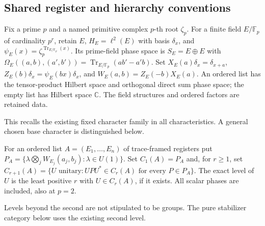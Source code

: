 \subsection{Shared register and hierarchy conventions}

\begin{definition}
Fix a prime $p$ and a named primitive complex $p$-th root $\zeta_p$.
For a finite field $E/\mathbb F_p$ of cardinality $p^r$, retain $E$,
$H_E=\ell^2(E)$ with basis $\delta_x$, and
$\psi_E(x)=\zeta_p^{\operatorname{Tr}_{E/\mathbb F_p}(x)}$.
Its prime-field phase space is $S_E=E\oplus E$ with
$\Omega_E((a,b),(a',b'))=\operatorname{Tr}_{E/\mathbb F_p}(ab'-a'b)$.
Set $X_E(a)\delta_x=\delta_{x+a}$,
$Z_E(b)\delta_x=\psi_E(bx)\delta_x$, and
$W_E(a,b)=Z_E(-b)X_E(a)$.
An ordered list has the tensor-product Hilbert space and orthogonal direct
sum phase space; the empty list has Hilbert space $\mathbb C$.
The field structures and ordered factors are retained data.
\end{definition}
\begin{scope}This recalls the existing fixed character family in all characteristics. A general chosen base character is distinguished below.\end{scope}

\begin{definition}
For an ordered list $A=(E_1,\ldots,E_n)$ of trace-framed registers put
$P_A=\{\lambda\bigotimes_j W_{E_j}(a_j,b_j):\lambda\in U(1)\}$.
Set $C_1(A)=P_A$ and, for $r\geq1$, set
$C_{r+1}(A)=\{U\text{ unitary}:UPU^*\in C_r(A)\text{ for every }P\in P_A\}$.
The exact level of $U$ is the least positive $r$ with $U\in C_r(A)$,
if it exists. All scalar phases are included, also at $p=2$.
\end{definition}
\begin{scope}Levels beyond the second are not stipulated to be groups. The pure stabilizer category below uses the existing second level.\end{scope}

